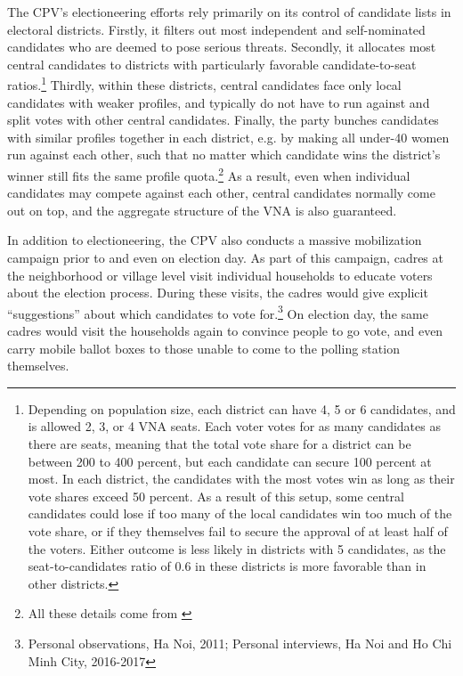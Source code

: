 \documentclass[12pt]{article}
\newcommand{\1}{\mathbbm{1}}
\begin{document}
The CPV's electioneering efforts rely primarily on its control of candidate lists in electoral districts. Firstly, it filters out most independent and self-nominated candidates who are deemed to pose serious threats. Secondly, it allocates most central candidates to districts with particularly favorable candidate-to-seat ratios.\footnote{Depending on population size, each district can have 4, 5 or 6 candidates, and is allowed 2, 3, or 4 VNA seats. Each voter votes for as many candidates as there are seats, meaning that the total vote share for a district can be between 200 to 400 percent, but each candidate can secure 100 percent at most. In each district, the candidates with the most votes win as long as their vote shares exceed 50 percent. As a result of this setup, some central candidates could lose if too many of the local candidates win too much of the vote share, or if they themselves fail to secure the approval of at least half of the voters. Either outcome is less likely in districts with 5 candidates, as the seat-to-candidates ratio of $0.6$ in these districts is more favorable than in other districts.} Thirdly, within these districts, central candidates face only local candidates with weaker profiles, and typically do not have to run against and split votes with other central candidates. Finally, the party bunches candidates with similar profiles together in each district, e.g. by making all under-40 women run against each other, such that no matter which candidate wins the district's winner still fits the same profile quota.\footnote{All these details come from \citet{MaleskySchuler2011}} As a result, even when individual candidates may compete against each other, central candidates normally come out on top, and the aggregate structure of the VNA is also guaranteed. 

In addition to electioneering, the CPV also conducts a massive mobilization campaign prior to and even on election day. As part of this campaign, cadres at the neighborhood or village level visit individual households to educate voters about the election process. During these visits, the cadres would give explicit ``suggestions'' about which candidates to vote for.\footnote{Personal observations, Ha Noi, 2011; Personal interviews, Ha Noi and Ho Chi Minh City, 2016-2017} On election day, the same cadres would visit the households again to convince people to go vote, and even carry mobile ballot boxes to those unable to come to the polling station themselves.
\end{document}
